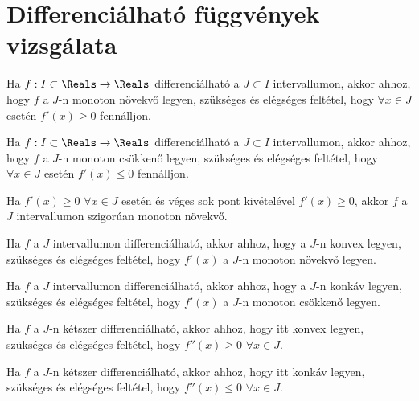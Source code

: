 \section{Differenciálható függvények vizsgálata}\label{section.6.4}

\begin{theorem}
  Ha $f : I \subset \Reals \rightarrow \Reals$ differenciálható a
  $J \subset I $ intervallumon, akkor ahhoz, hogy $f$ a $J$-n monoton növekvő
  legyen, szükséges és elégséges feltétel, hogy $\forall x \in J$ esetén
  $f'(x)\geq 0$ fennálljon.
\end{theorem}

\begin{theorem}
  Ha $f : I \subset \Reals \rightarrow \Reals$ differenciálható a
  $J \subset I $ intervallumon, akkor ahhoz, hogy $f$ a $J$-n monoton csökkenő
  legyen, szükséges és elégséges feltétel, hogy $\forall x \in J$ esetén
  $f'(x)\leq 0$ fennálljon.
\end{theorem}

\begin{note}
  Ha $f'(x) \geq 0$ $\forall x \in J$ esetén és véges sok pont kivételével
  $f'(x)\geq 0$, akkor $f$ a $J$ intervallumon szigorúan monoton növekvő.
\end{note}

\begin{theorem}
  Ha $f$ a $J$ intervallumon differenciálható, akkor ahhoz, hogy a $J$-n konvex
  legyen, szükséges és elégséges feltétel, hogy $f'(x)$ a $J$-n monoton növekvő
  legyen.
\end{theorem}

\begin{theorem}
  Ha $f$ a $J$ intervallumon differenciálható, akkor ahhoz, hogy a $J$-n konkáv
  legyen, szükséges és elégséges feltétel, hogy $f'(x)$ a $J$-n monoton csökkenő
  legyen.
\end{theorem}

\begin{theorem}
  Ha $f$ a $J$-n kétszer differenciálható, akkor ahhoz, hogy itt konvex legyen,
  szükséges és elégséges feltétel, hogy $f''(x)\geq 0$ $\forall x\in J$.
\end{theorem}

\begin{theorem}
  Ha $f$ a $J$-n kétszer differenciálható, akkor ahhoz, hogy itt konkáv legyen,
  szükséges és elégséges feltétel, hogy $f''(x)\leq 0$ $\forall x\in J$.
\end{theorem}

